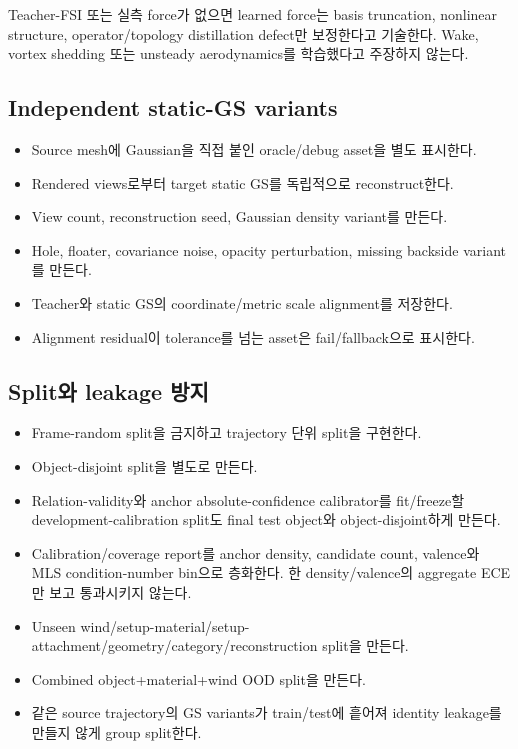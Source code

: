 \documentclass[10pt,a4paper]{article}
\newcommand{\todo}{\textcolor{TodoGray}{\(\square\)}}
\begin{document}
\begin{tcolorbox}[colback=LightOrange,colframe=orange!60!black,title=Claim 제한,fonttitle=\bfseries]
Teacher-FSI 또는 실측 force가 없으면 learned force는 basis truncation, nonlinear structure,
operator/topology distillation defect만 보정한다고 기술한다. Wake, vortex shedding 또는 unsteady aerodynamics를 학습했다고 주장하지 않는다.
\end{tcolorbox}

\subsection*{Independent static-GS variants}

\begin{itemize}
  \item[\todo] Source mesh에 Gaussian을 직접 붙인 oracle/debug asset을 별도 표시한다.
  \item[\todo] Rendered views로부터 target static GS를 독립적으로 reconstruct한다.
  \item[\todo] View count, reconstruction seed, Gaussian density variant를 만든다.
  \item[\todo] Hole, floater, covariance noise, opacity perturbation, missing backside variant를 만든다.
  \item[\todo] Teacher와 static GS의 coordinate/metric scale alignment를 저장한다.
  \item[\todo] Alignment residual이 tolerance를 넘는 asset은 fail/fallback으로 표시한다.
\end{itemize}

\subsection*{Split와 leakage 방지}

\begin{itemize}
  \item[\todo] Frame-random split을 금지하고 trajectory 단위 split을 구현한다.
  \item[\todo] Object-disjoint split을 별도로 만든다.
  \item[\todo] Relation-validity와 anchor absolute-confidence calibrator를 fit/freeze할
  development-calibration split도 final test object와 object-disjoint하게 만든다.
  \item[\todo] Calibration/coverage report를 anchor density, candidate count, valence와
  MLS condition-number bin으로 층화한다. 한 density/valence의 aggregate ECE만 보고 통과시키지 않는다.
  \item[\todo] Unseen wind/setup-material/setup-attachment/geometry/category/reconstruction split을 만든다.
  \item[\todo] Combined object+material+wind OOD split을 만든다.
  \item[\todo] 같은 source trajectory의 GS variants가 train/test에 흩어져 identity leakage를 만들지 않게 group split한다.
\end{itemize}
\end{document}
